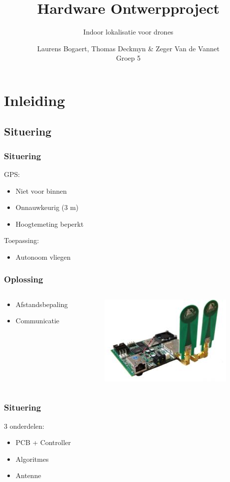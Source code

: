 \documentclass{beamer}
\title{\textbf{Hardware Ontwerpproject}}
\subtitle{Indoor lokalisatie voor drones}
\author{Laurens Bogaert, Thomas Deckmyn \& Zeger Van de Vannet\\Groep 5}
\begin{document}
\begin{frame}
  \titlepage
\end{frame}

\section{Inleiding}
\subsection{Situering}
  \begin{frame}
    \frametitle{Situering}
    GPS:
    \begin{itemize}
        \item Niet voor binnen
        \item Onnauwkeurig (3 m)
        \item Hoogtemeting beperkt
    \end{itemize}
    Toepassing:
     \begin{itemize}
        \item Autonoom vliegen
    \end{itemize}   
  \end{frame}
  \begin{frame}
  \frametitle{Oplossing}
   \begin{columns}
    \begin{column}{0.5\textwidth}
  	\begin{itemize}
  		\item Afstandsbepaling
  		\item Communicatie
  	\end{itemize} 
    \end{column}
    \begin{column}{0.5\textwidth}
  	\includegraphics[width=\textwidth]{images/Pulson400UWB.jpg}
    \end{column}
    \end{columns}
  \end{frame} 
  \begin{frame}
    \frametitle{Situering}
    3 onderdelen:
    \begin{itemize}
      \item PCB + Controller
      \item Algoritmes
      \item Antenne
    \end{itemize}
  \end{frame}
\end{document}
